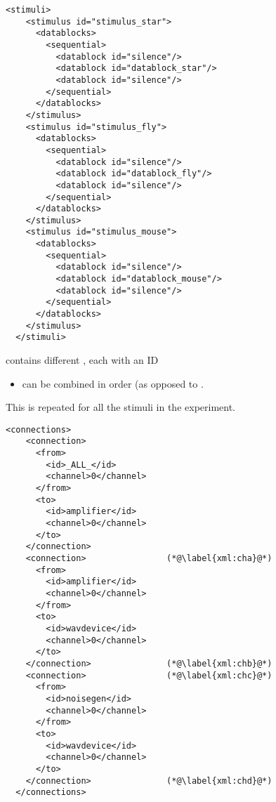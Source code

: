    
   

\begin{lstlisting}
<stimuli>
    <stimulus id="stimulus_star">
      <datablocks>
        <sequential>
          <datablock id="silence"/>
          <datablock id="datablock_star"/>
          <datablock id="silence"/>
        </sequential>
      </datablocks>
    </stimulus>
    <stimulus id="stimulus_fly">
      <datablocks>
        <sequential>
          <datablock id="silence"/>
          <datablock id="datablock_fly"/>
          <datablock id="silence"/>
        </sequential>
      </datablocks>
    </stimulus>
    <stimulus id="stimulus_mouse">
      <datablocks>
        <sequential>
          <datablock id="silence"/>
          <datablock id="datablock_mouse"/>
          <datablock id="silence"/>
        </sequential>
      </datablocks>
    </stimulus>
  </stimuli>
\end{lstlisting}
 


 contains different , each with
an ID 

\begin{itemize}\item {}
can be combined in  order (as opposed to
.
\end{itemize}

This is repeated for all the stimuli in the experiment.

  

\begin{lstlisting}
<connections>
    <connection>
      <from>
        <id>_ALL_</id>
        <channel>0</channel>
      </from>
      <to>
        <id>amplifier</id>
        <channel>0</channel>
      </to>
    </connection>
    <connection>                (*@\label{xml:cha}@*)
      <from>
        <id>amplifier</id>
        <channel>0</channel>
      </from>
      <to>
        <id>wavdevice</id>
        <channel>0</channel>
      </to>
    </connection>               (*@\label{xml:chb}@*)
    <connection>                (*@\label{xml:chc}@*)
      <from>
        <id>noisegen</id>
        <channel>0</channel>
      </from>
      <to>
        <id>wavdevice</id>
        <channel>0</channel>
      </to>
    </connection>               (*@\label{xml:chd}@*)
  </connections>

\end{lstlisting}

